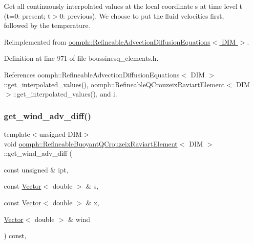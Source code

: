 Get all continuously interpolated values at the local coordinate s at time level t (t=0\+: present; t$>$0\+: previous). We choose to put the fluid velocities first, followed by the temperature. 



Reimplemented from \hyperlink{classoomph_1_1RefineableAdvectionDiffusionEquations_a0a916bc1f20ff94e7feed984d41148fb}{oomph\+::\+Refineable\+Advection\+Diffusion\+Equations$<$ D\+I\+M $>$}.



Definition at line 971 of file boussinesq\+\_\+elements.\+h.



References oomph\+::\+Refineable\+Advection\+Diffusion\+Equations$<$ D\+I\+M $>$\+::get\+\_\+interpolated\+\_\+values(), oomph\+::\+Refineable\+Q\+Crouzeix\+Raviart\+Element$<$ D\+I\+M $>$\+::get\+\_\+interpolated\+\_\+values(), and i.

\mbox{\label{classoomph_1_1RefineableBuoyantQCrouzeixRaviartElement_a093f484b86df6e7cb59d4cc9e605fb51}} 
\subsubsection{\texorpdfstring{get\+\_\+wind\+\_\+adv\+\_\+diff()}{get\_wind\_adv\_diff()}}
{\footnotesize\ttfamily template$<$unsigned D\+IM$>$ \\
void \hyperlink{classoomph_1_1RefineableBuoyantQCrouzeixRaviartElement}{oomph\+::\+Refineable\+Buoyant\+Q\+Crouzeix\+Raviart\+Element}$<$ D\+IM $>$\+::get\+\_\+wind\+\_\+adv\+\_\+diff (\begin{DoxyParamCaption}\item[{const unsigned \&}]{ipt,  }\item[{const \hyperlink{classoomph_1_1Vector}{Vector}$<$ double $>$ \&}]{s,  }\item[{const \hyperlink{classoomph_1_1Vector}{Vector}$<$ double $>$ \&}]{x,  }\item[{\hyperlink{classoomph_1_1Vector}{Vector}$<$ double $>$ \&}]{wind }\end{DoxyParamCaption}) const\hspace{0.3cm}{\ttfamily [inline]}, {\ttfamily [virtual]}}



